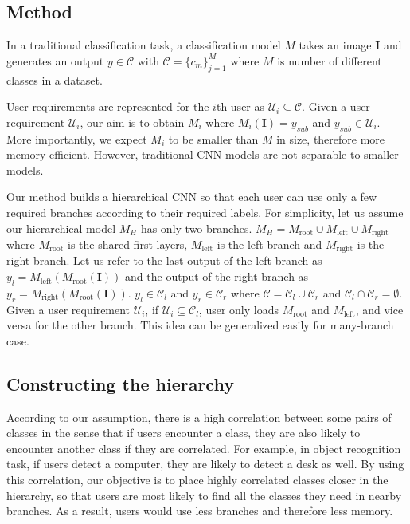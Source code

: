 \subsection{Method}

In a traditional classification task, a classification model $M$ takes an image $\mathbf{I}$ and generates an output $y\in\mathcal{C}$ with $\mathcal{C} = \{c_m\}_{j=1}^M$ where $M$ is number of different classes in a dataset.

User requirements are represented for the $i$th user as $\mathcal{U}_i \subseteq \mathcal{C}$. 
Given a user requirement $\mathcal{U}_i$, our aim is to obtain $M_i$ where $M_i(\mathbf{I}) = y_{sub}$ and $y_{sub}\in\mathcal{U}_i$. 
More importantly, we expect $M_i$ to be smaller than $M$ in size, therefore more memory efficient. However, traditional CNN models are not separable to smaller models.

Our method builds a hierarchical CNN so that each user can use only a few required branches according to their required labels. 
For simplicity, let us assume our hierarchical model $M_H$ has only two branches.
$M_H = M_\mathrm{root} \cup M_\mathrm{left} \cup M_\mathrm{right}$ where $M_\mathrm{root}$ is the shared first layers, $M_\mathrm{left}$ is the left branch and $M_\mathrm{right}$ is the right branch. 
Let us refer to the last output of the left branch as $y_l = M_\mathrm{left}(M_\mathrm{root}(\mathbf{I}))$ and the output of the right branch as $y_r = M_\mathrm{right}(M_\mathrm{root}(\mathbf{I}))$.
$y_l\in\mathcal{C}_l$ and $y_r\in\mathcal{C}_r$ where $\mathcal{C} = \mathcal{C}_l \cup \mathcal{C}_r$ and $\mathcal{C}_l \cap \mathcal{C}_r = \emptyset$. 
Given a user requirement $\mathcal{U}_i$, if $\mathcal{U}_i \subseteq \mathcal{C}_l$, user only loads $M_\mathrm{root}$ and $M_\mathrm{left}$, and vice versa for the other branch.
This idea can be generalized easily for many-branch case.

\subsection{Constructing the hierarchy}
\label{ssec:hierarchy}

According to our assumption, there is a high correlation between some pairs of classes in the sense that 
if users encounter a class, they are also likely to encounter another class if they are correlated. 
For example, in object recognition task, if users detect a computer, they are likely to detect a desk as well. 
By using this correlation, our objective is to place highly correlated classes closer in the hierarchy, 
so that users are most likely to find all the classes they need in nearby branches. 
As a result, users would use less branches and therefore less memory.

